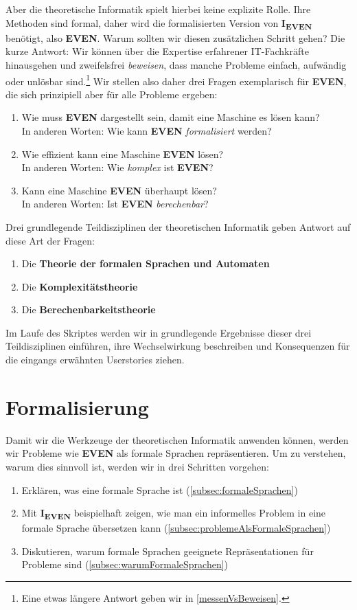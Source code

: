 Aber die theoretische Informatik spielt hierbei keine explizite Rolle.
Ihre Methoden sind formal,
daher wird die formalisierten Version von \textbf{I\textsubscript{EVEN}} benötigt,
also \textbf{EVEN}.
Warum sollten wir diesen zusätzlichen Schritt gehen?
Die kurze Antwort:
Wir können über die Expertise erfahrener IT-Fachkräfte hinausgehen
und zweifelsfrei \emph{beweisen},
dass manche Probleme einfach, aufwändig oder unlösbar sind.\footnote{
    Eine etwas längere Antwort geben wir in \autoref{messenVsBeweisen}.
}
Wir stellen also daher drei Fragen exemplarisch für \textbf{EVEN},
die sich prinzipiell aber für alle Probleme ergeben:
\begin{enumerate}
    \item Wie muss \textbf{EVEN} dargestellt sein, damit eine Maschine es lösen kann?\\ 
        In anderen Worten: Wie kann \textbf{EVEN} \emph{formalisiert} werden? 
    \item Wie effizient kann eine Maschine \textbf{EVEN} lösen?\\
        In anderen Worten: Wie \emph{komplex} ist \textbf{EVEN}?
    \item Kann eine Maschine \textbf{EVEN} überhaupt lösen?\\
        In anderen Worten: Ist \textbf{EVEN} \emph{berechenbar}?  
\end{enumerate}
Drei grundlegende Teildisziplinen der theoretischen Informatik
geben Antwort auf diese Art der Fragen:
\begin{enumerate}
    \item Die \textbf{Theorie der formalen Sprachen und Automaten}
    \item Die \textbf{Komplexitätstheorie}
    \item Die \textbf{Berechenbarkeitstheorie}
\end{enumerate}
Im Laufe des Skriptes werden wir
in grundlegende Ergebnisse dieser drei Teildisziplinen einführen,
ihre Wechselwirkung beschreiben
und Konsequenzen für die eingangs erwähnten Userstories ziehen.

\section{Formalisierung}\label{sec:formalisierung}

Damit wir die Werkzeuge der theoretischen Informatik anwenden können,
werden wir Probleme wie \textbf{EVEN} als formale Sprachen repräsentieren.
Um zu verstehen, warum dies sinnvoll ist,
werden wir in drei Schritten vorgehen:
\begin{enumerate}
    \item Erklären, was eine formale Sprache ist (\autoref{subsec:formaleSprachen})
    \item Mit \textbf{I\textsubscript{EVEN}} beispielhaft zeigen,
        wie man ein informelles Problem in eine formale Sprache übersetzen kann 
        (\autoref{subsec:problemeAlsFormaleSprachen})
    \item Diskutieren, warum formale Sprachen geeignete Repräsentationen für Probleme sind
        (\autoref{subsec:warumFormaleSprachen})
\end{enumerate}

